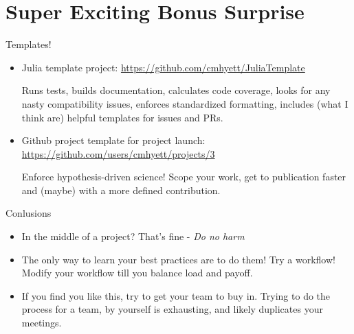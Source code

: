 \documentclass{beamer}
\begin{document}
\section{Super Exciting Bonus Surprise}
\begin{frame}{Templates!}
  \begin{itemize}
  \item Julia template project: \url{https://github.com/cmhyett/JuliaTemplate}

    Runs tests, builds documentation, calculates code coverage, looks for any nasty compatibility issues, enforces standardized formatting, includes (what I think are) helpful templates for issues and PRs.

  \item Github project template for project launch: \url{https://github.com/users/cmhyett/projects/3}

    Enforce hypothesis-driven science! Scope your work, get to publication faster and (maybe) with a more defined contribution.
  \end{itemize}
\end{frame}

\begin{frame}{Conlusions}
  \begin{itemize}
  \item In the middle of a project? That's fine - \textit{Do no harm}
  \item The only way to learn your best practices are to do them! Try a workflow! Modify your workflow till you balance load and payoff.
  \item If you find you like this, try to get your team to buy in. Trying to do the process for a team, by yourself is exhausting, and likely duplicates your meetings.
  \end{itemize}
\end{frame}
\end{document}
